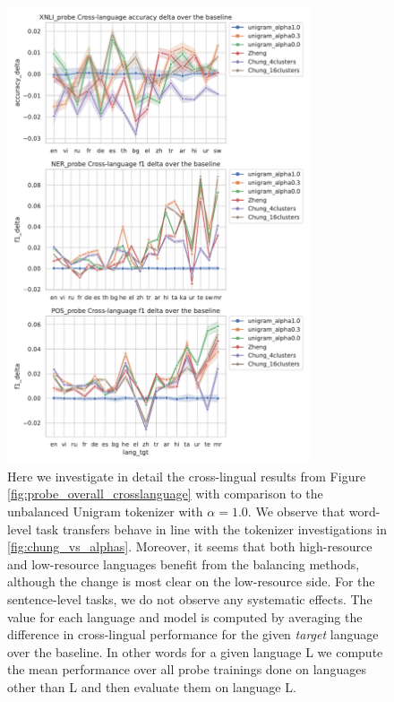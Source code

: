 \begin{figure}[H]
    \centering
    \includegraphics[width=0.8\textwidth]{figures/probe_detailed_crosslanguage_over_baseline_lang_tgt.pdf}
    \caption{Here we investigate in detail the cross-lingual results from Figure \ref{fig:probe_overall_crosslanguage} with comparison to the unbalanced Unigram tokenizer with $\alpha=1.0$. We observe that word-level task transfers behave in line with the tokenizer investigations in \ref{fig:chung_vs_alphas}. Moreover, it seems that both high-resource and low-resource languages benefit from the balancing methods, although the change is most clear on the low-resource side. For the sentence-level tasks, we do not observe any systematic effects. The value for each language and model is computed by averaging the difference in cross-lingual performance for the given \textit{target} language over the baseline. In other words for a given language L we compute the mean performance over all probe trainings done on languages other than L and then evaluate them on language L.}
    \label{fig:probe_overall_crosslanguage_over_baseline}
\end{figure}

